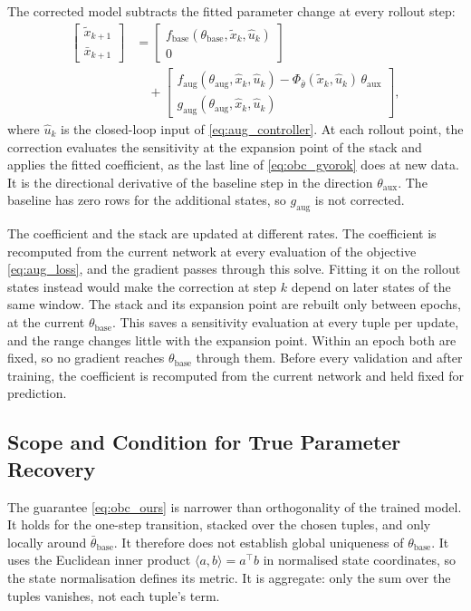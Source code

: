 The corrected model subtracts the fitted parameter change at every rollout
step:
\begin{equation}
\begin{aligned}
 \begin{bmatrix}\tilde x_{k+1}\\ \bar x_{k+1}\end{bmatrix}
 &=\begin{bmatrix}f_{\mathrm{base}}(\theta_{\mathrm{base}},\tilde x_k,\hat u_k)\\ 0\end{bmatrix}\\
 &\quad+\begin{bmatrix}f_{\mathrm{aug}}(\theta_{\mathrm{aug}},\hat x_k,\hat u_k)
   -\Phi_{\bar\theta}(\tilde x_k,\hat u_k)\,\theta_{\mathrm{aux}}\\
   g_{\mathrm{aug}}(\theta_{\mathrm{aug}},\hat x_k,\hat u_k)\end{bmatrix},
\end{aligned}
\label{eq:obc_model}
\end{equation}
where $\hat u_k$ is the closed-loop input of \eqref{eq:aug_controller}.
At each rollout point, the correction evaluates the sensitivity at the
expansion point of the stack and applies the fitted coefficient, as the
last line of \eqref{eq:obc_gyorok} does at new data.
It is the directional derivative of the baseline step in the direction
$\theta_{\mathrm{aux}}$.
The baseline has zero rows for the additional states, so $g_{\mathrm{aug}}$
is not corrected.

The coefficient and the stack are updated at different rates.
The coefficient is recomputed from the current network at every evaluation
of the objective \eqref{eq:aug_loss}, and the gradient passes through this
solve.
Fitting it on the rollout states instead would make the correction at step
$k$ depend on later states of the same window.
The stack and its expansion point are rebuilt only between epochs, at the
current $\theta_{\mathrm{base}}$.
This saves a sensitivity evaluation at every tuple per update, and the range
changes little with the expansion point.
Within an epoch both are fixed, so no gradient reaches
$\theta_{\mathrm{base}}$ through them.
Before every validation and after training, the coefficient is recomputed
from the current network and held fixed for prediction.

\subsection{Scope and Condition for True Parameter Recovery}\label{sec:obc_scope}
The guarantee \eqref{eq:obc_ours} is narrower than orthogonality of the
trained model.
It holds for the one-step transition, stacked over the chosen tuples, and
only locally around $\bar\theta_{\mathrm{base}}$.
It therefore does not establish global uniqueness of $\theta_{\mathrm{base}}$.
It uses the Euclidean inner product $\langle a,b\rangle=a^\top b$ in
normalised state coordinates, so the state normalisation defines its metric.
It is aggregate: only the sum over the tuples vanishes, not each tuple's
term.

